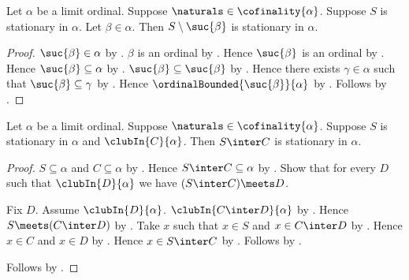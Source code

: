\begin{corollary}\label{stationary_strict_tail}
    Let $\alpha$ be a limit ordinal.
    Suppose $\naturals\in\cofinality{\alpha}$.
    Suppose $S$ is stationary in $\alpha$.
    Let $\beta\in\alpha$.
    Then $S\setminus\suc{\beta}$ is stationary in $\alpha$.
\end{corollary}
\begin{proof}
    $\suc{\beta}\in\alpha$ by .
    $\beta$ is an ordinal by .
    Hence $\suc{\beta}$ is an ordinal by .
    Hence $\suc{\beta}\subseteq\alpha$
        by .
    $\suc{\beta}\subseteq\suc{\beta}$ by .
    Hence there exists $\gamma\in\alpha$ such that
        $\suc{\beta}\subseteq\gamma$ by \auto.
    Hence $\ordinalBounded{\suc{\beta}}{\alpha}$
        by .
    Follows by .
\end{proof}

\begin{theorem}\label{stationary_intersection_club}
    Let $\alpha$ be a limit ordinal.
    Suppose $\naturals\in\cofinality{\alpha}$.
    Suppose $S$ is stationary in $\alpha$ and $\clubIn{C}{\alpha}$.
    Then $S\inter C$ is stationary in $\alpha$.
\end{theorem}
\begin{proof}
    $S\subseteq\alpha$ and $C\subseteq\alpha$
        by .
    Hence $S\inter C\subseteq\alpha$ by .
    Show that for every $D$ such that $\clubIn{D}{\alpha}$
        we have $(S\inter C)\meets D$.
    \begin{subproof}
        Fix $D$.
        Assume $\clubIn{D}{\alpha}$.
        $\clubIn{C\inter D}{\alpha}$
            by .
        Hence $S\meets(C\inter D)$ by .
        Take $x$ such that $x\in S$ and $x\in C\inter D$
            by .
        Hence $x\in C$ and $x\in D$
            by .
        Hence $x\in S\inter C$ by .
        Follows by .
    \end{subproof}
    Follows by .
\end{proof}

